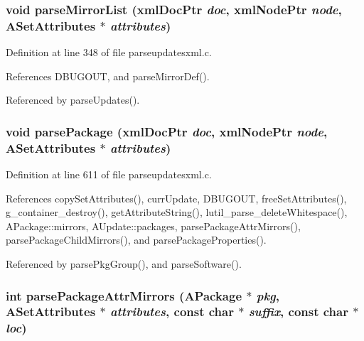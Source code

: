 \subsubsection{\setlength{\rightskip}{0pt plus 5cm}void parse\-Mirror\-List (xml\-Doc\-Ptr {\em doc}, xml\-Node\-Ptr {\em node}, {\bf ASet\-Attributes} $\ast$ {\em attributes})\hspace{0.3cm}{\tt  [static]}}\label{parseupdatesxml_8c_a7}




Definition at line 348 of file parseupdatesxml.c.

References DBUGOUT, and parse\-Mirror\-Def().

Referenced by parse\-Updates().
\subsubsection{\setlength{\rightskip}{0pt plus 5cm}void parse\-Package (xml\-Doc\-Ptr {\em doc}, xml\-Node\-Ptr {\em node}, {\bf ASet\-Attributes} $\ast$ {\em attributes})\hspace{0.3cm}{\tt  [static]}}\label{parseupdatesxml_8c_a11}




Definition at line 611 of file parseupdatesxml.c.

References copy\-Set\-Attributes(), curr\-Update, DBUGOUT, free\-Set\-Attributes(), g\_\-container\_\-destroy(), get\-Attribute\-String(), lutil\_\-parse\_\-delete\-Whitespace(), APackage::mirrors, AUpdate::packages, parse\-Package\-Attr\-Mirrors(), parse\-Package\-Child\-Mirrors(), and parse\-Package\-Properties().

Referenced by parse\-Pkg\-Group(), and parse\-Software().
\subsubsection{\setlength{\rightskip}{0pt plus 5cm}int parse\-Package\-Attr\-Mirrors ({\bf APackage} $\ast$ {\em pkg}, {\bf ASet\-Attributes} $\ast$ {\em attributes}, const char $\ast$ {\em suffix}, const char $\ast$ {\em loc})\hspace{0.3cm}{\tt  [static]}}\label{parseupdatesxml_8c_a18}




